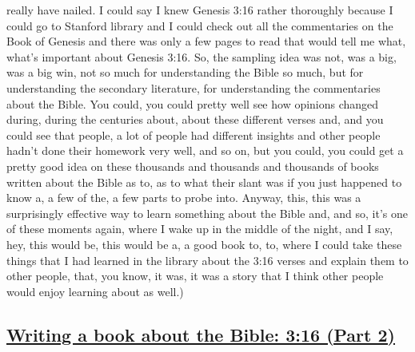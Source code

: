 \documentclass[]{article}
\begin{document}
really have nailed. I could say I knew Genesis 3:16 rather thoroughly
because I could go to Stanford library and I could check out all the
commentaries on the Book of Genesis and there was only a few pages to
read that would tell me what, what's important about Genesis 3:16. So,
the sampling idea was not, was a big, was a big win, not so much for
understanding the Bible so much, but for understanding the secondary
literature, for understanding the commentaries about the Bible. You
could, you could pretty well see how opinions changed during, during the
centuries about, about these different verses and, and you could see
that people, a lot of people had different insights and other people
hadn't done their homework very well, and so on, but you could, you
could get a pretty good idea on these thousands and thousands and
thousands of books written about the Bible as to, as to what their slant
was if you just happened to know a, a few of the, a few parts to probe
into. Anyway, this, this was a surprisingly effective way to learn
something about the Bible and, and so, it's one of these moments again,
where I wake up in the middle of the night, and I say, hey, this would
be, this would be a, a good book to, to, where I could take these things
that I had learned in the library about the 3:16 verses and explain them
to other people, that, you know, it was, it was a story that I think
other people would enjoy learning about as well.)

\subsection{\texorpdfstring{\href{http://webofstories.com/play/17132}{Writing
a book about the Bible: 3:16 (Part
2)}}{Writing a book about the Bible: 3:16 (Part 2)}}\label{writing-a-book-about-the-bible-316-part-2}
\end{document}
